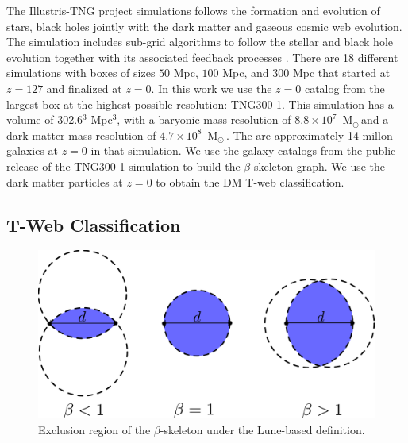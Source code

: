 \documentclass[usenatbib]{mnras}
\newcommand{\Msun}{\,{\rm M}$_{\odot}$\,}
\begin{document}
The Illustris-TNG project simulations follows the formation and evolution of stars, black holes jointly with the dark matter and gaseous cosmic web evolution. 
The simulation includes sub-grid algorithms to follow the stellar and black hole evolution together with its associated feedback processes \citep{Nelson2019,Springel2018}.
There are 18 different simulations with boxes of sizes $50$ Mpc, $100$ Mpc, and $300$ Mpc that started at $z=127$ and finalized at $z=0$.    
In this work we use the $z=0$ catalog from the largest box at the highest possible resolution: TNG300-1.
This simulation has a volume of 302.6$^3$ Mpc$^3$, with a baryonic mass resolution of $8.8\times 10^{7}$ \Msun and a dark matter mass resolution of $4.7\times  10^{8}$ \Msun \citep{Nelson2019}.
The are approximately 14 millon galaxies at $z=0$ in that simulation.
We use the galaxy catalogs from the public release of the TNG300-1 simulation \citep{Pillepich2018a} to build the $\beta$-skeleton graph.
We use the dark matter particles at $z=0$ to obtain the DM T-web classification. 
 
\subsection{T-Web Classification}

\begin{figure}
\centering
 \includegraphics[scale=0.18]{Figs/p_beta.pdf}
 \caption{Exclusion region of the $\beta$-skeleton under the Lune-based definition.}  
 \label{fig:beta}
\end{figure}
\end{document}
